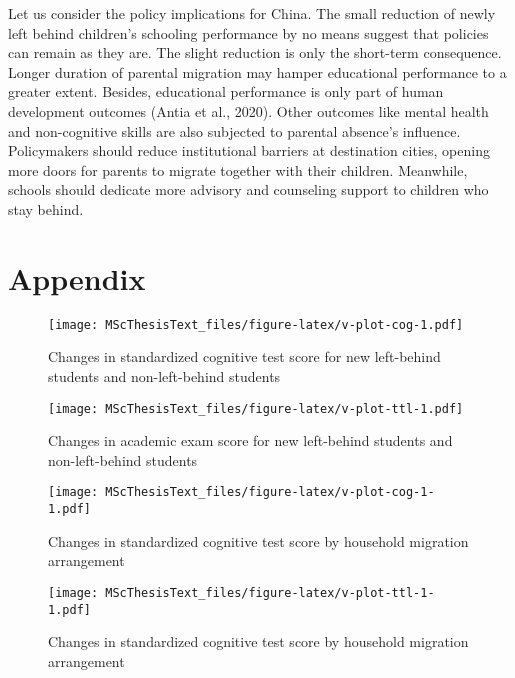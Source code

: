 \documentclass[
  man,floatsintext]{apa7}
\begin{document}
Let us consider the policy implications for China. The small reduction of newly left behind children's schooling performance by no means suggest that policies can remain as they are. The slight reduction is only the short-term consequence. Longer duration of parental migration may hamper educational performance to a greater extent. Besides, educational performance is only part of human development outcomes (Antia et al., 2020). Other outcomes like mental health and non-cognitive skills are also subjected to parental absence's influence. Policymakers should reduce institutional barriers at destination cities, opening more doors for parents to migrate together with their children. Meanwhile, schools should dedicate more advisory and counseling support to children who stay behind.

\newpage

\hypertarget{appendix}{%
\section{Appendix}\label{appendix}}









\begin{figure}
\centering
\texttt{[image: MScThesisText\_files/figure-latex/v-plot-cog-1.pdf]}
\caption{\label{fig:v-plot-cog}Changes in standardized cognitive test score for new left-behind students and non-left-behind students}
\end{figure}

\newpage

\begin{figure}
\centering
\texttt{[image: MScThesisText\_files/figure-latex/v-plot-ttl-1.pdf]}
\caption{\label{fig:v-plot-ttl}Changes in academic exam score for new left-behind students and non-left-behind students}
\end{figure}

\newpage

\begin{figure}
\centering
\texttt{[image: MScThesisText\_files/figure-latex/v-plot-cog-1-1.pdf]}
\caption{\label{fig:v-plot-cog-1}Changes in standardized cognitive test score by household migration arrangement}
\end{figure}

\newpage

\begin{figure}
\centering
\texttt{[image: MScThesisText\_files/figure-latex/v-plot-ttl-1-1.pdf]}
\caption{\label{fig:v-plot-ttl-1}Changes in standardized cognitive test score by household migration arrangement}
\end{figure}
\end{document}
